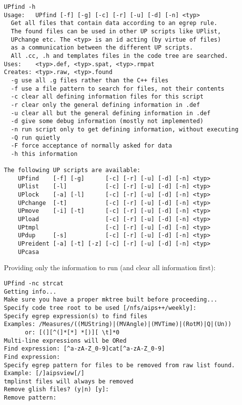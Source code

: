 \begin{verbatim}
UPfind -h 
Usage:   UPfind [-f] [-g] [-c] [-r] [-u] [-d] [-n] <typ>
  Get all files that contain data according to an egrep rule.
  The found files can be used in other UP scripts like UPlist, 
  UPchange etc. The <typ> is an id acting (by virtue of files) 
  as a communication between the different UP scripts.
  All .cc, .h and templates files in the code tree are searched.
Uses:    <typ>.def, <typ>.spat, <typ>.rmpat
Creates: <typ>.raw, <typ>.found
  -g use all .g files rather than the C++ files
  -f use a file pattern to search for files, not their contents
  -c clear all defining information files for this script
  -r clear only the general defining information in .def
  -u clear all but the general defining information in .def
  -d give some debug information (mostly not implemented)
  -n run script only to get defining information, without executing
  -Q run quietly
  -F force acceptance of normally asked for data
  -h this information

The following UP scripts are available:
    UPfind    [-f] [-g]      [-c] [-r] [-u] [-d] [-n] <typ>
    UPlist    [-l]           [-c] [-r] [-u] [-d] [-n] <typ>         
    UPlock    [-a] [-l]      [-c] [-r] [-u] [-d] [-n] <typ>
    UPchange  [-t]           [-c] [-r] [-u] [-d] [-n] <typ>
    UPmove    [-i] [-t]      [-c] [-r] [-u] [-d] [-n] <typ>
    UPload                   [-c] [-r] [-u] [-d] [-n] <typ>
    UPtmpl                   [-c] [-r] [-u] [-d] [-n] <typ>
    UPdup     [-s]           [-c] [-r] [-u] [-d] [-n] <typ>
    UPreident [-a] [-t] [-z] [-c] [-r] [-u] [-d] [-n] <typ>
    UPcasa
\end{verbatim}

\noindent
Providing only the information to run (and clear all information first):

\begin{verbatim}
UPfind -nc strcat
Getting info...
Make sure you have a proper mktree built before proceeding...
Specify code tree root to be used [/nfs/aips++/weekly]: 
Specify egrep expression(s) to find files
Examples: /Measures/((MUString)|(MVAngle)|(MVTime)|(RotM)|Q|(Un))
      or: [(][^(]*[*] *[)][ \t]*0
Multi-line expressions will be ORed
Find expression: [^a-zA-Z_0-9]cat[^a-zA-Z_0-9]
Find expression: 
Specify egrep pattern for files to be removed from raw list found.
Example: [/]aipsview[/]
tmplinst files will always be removed
Remove glish files? (y|n) [y]: 
Remove pattern: 
\end{verbatim}

